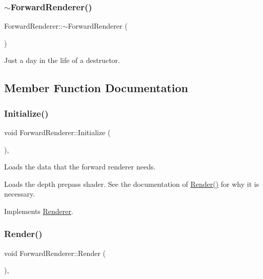 \subsubsection{\texorpdfstring{$\sim$\+Forward\+Renderer()}{~ForwardRenderer()}}
{\footnotesize\ttfamily Forward\+Renderer\+::$\sim$\+Forward\+Renderer (\begin{DoxyParamCaption}{ }\end{DoxyParamCaption})\hspace{0.3cm}{\ttfamily [virtual]}}



Just a day in the life of a destructor. 



\subsection{Member Function Documentation}
\hypertarget{class_forward_renderer_a5cbca647822780d6cfbd39552d73ee06}{}\label{class_forward_renderer_a5cbca647822780d6cfbd39552d73ee06} 
\subsubsection{\texorpdfstring{Initialize()}{Initialize()}}
{\footnotesize\ttfamily void Forward\+Renderer\+::\+Initialize (\begin{DoxyParamCaption}{ }\end{DoxyParamCaption})\hspace{0.3cm}{\ttfamily [override]}, {\ttfamily [virtual]}}



Loads the data that the forward renderer needs. 

Loads the depth prepass shader. See the documentation of \hyperlink{class_forward_renderer_a1a5deafa5deaf1e0abaab0e2074928c1}{Render()} for why it is necessary. 

Implements \hyperlink{class_renderer_a7cb221f355f181d84d66e8c09f50f04a}{Renderer}.

\hypertarget{class_forward_renderer_a1a5deafa5deaf1e0abaab0e2074928c1}{}\label{class_forward_renderer_a1a5deafa5deaf1e0abaab0e2074928c1} 
\subsubsection{\texorpdfstring{Render()}{Render()}}
{\footnotesize\ttfamily void Forward\+Renderer\+::\+Render (\begin{DoxyParamCaption}{ }\end{DoxyParamCaption})\hspace{0.3cm}{\ttfamily [override]}, {\ttfamily [virtual]}}



